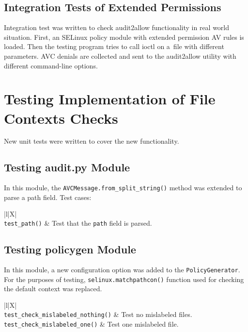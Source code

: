 \subsection{Integration Tests of Extended Permissions}

Integration test was written to check audit2allow functionality in real world
situation. First, an SELinux policy module with extended permission AV rules is
loaded. Then the testing program tries to call ioctl on a~file with different
parameters. AVC denials are collected and sent to the audit2allow utility with
different command-line options.

\section{Testing Implementation of File Contexts Checks}
New unit tests were written to cover the new functionality.

\subsection{Testing audit.py Module}
In this module, the \texttt{AVCMessage.from\_split\_string()} method was
extended to parse a path field. Test cases:
\begin{longtabu}{|l|X|} \hline
    \\ \hline
    \texttt{test\_path()} & Test that the \texttt{path} field is parsed.
    \\ \hline
\end{longtabu}

\subsection{Testing policygen Module}
In this module, a new configuration option was added to the
\texttt{PolicyGenerator}. For the purposes of testing,
\texttt{selinux.matchpathcon()} function used for checking the default context
was replaced. 
\begin{longtabu}{|l|X|} \hline
    \\ \hline
    \texttt{test\_check\_mislabeled\_nothing()} & Test no mislabeled files.
    \\ \hline
    \texttt{test\_check\_mislabeled\_one()} & Test one mislabeled file.
    \\ \hline
\end{longtabu}

